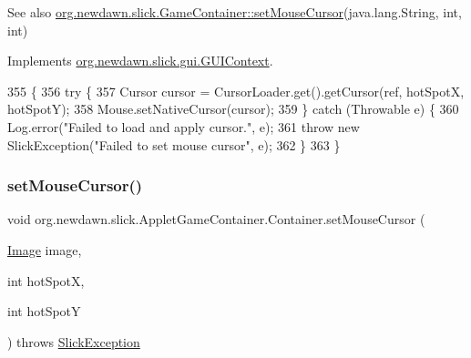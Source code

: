 \begin{DoxySeeAlso}{See also}
\mbox{\hyperlink{classorg_1_1newdawn_1_1slick_1_1_game_container_a13e789e67755f14bad1caf70e3bd6d4e}{org.\+newdawn.\+slick.\+Game\+Container\+::set\+Mouse\+Cursor}}(java.\+lang.\+String, int, int) 
\end{DoxySeeAlso}


Implements \mbox{\hyperlink{interfaceorg_1_1newdawn_1_1slick_1_1gui_1_1_g_u_i_context_a47c70498d554deaf50e328ec79385a20}{org.\+newdawn.\+slick.\+gui.\+G\+U\+I\+Context}}.


\begin{DoxyCode}
355                                                                                                \{
356          \textcolor{keywordflow}{try} \{
357             Cursor cursor = CursorLoader.get().getCursor(ref, hotSpotX, hotSpotY);
358             Mouse.setNativeCursor(cursor);
359          \} \textcolor{keywordflow}{catch} (Throwable e) \{
360             Log.error(\textcolor{stringliteral}{"Failed to load and apply cursor."}, e);
361             \textcolor{keywordflow}{throw} \textcolor{keyword}{new} SlickException(\textcolor{stringliteral}{"Failed to set mouse cursor"}, e);
362          \}
363       \}
\end{DoxyCode}
\mbox{\label{classorg_1_1newdawn_1_1slick_1_1_applet_game_container_1_1_container_a8080eb4d0538a0dfc9ae43dfae3f07d0}} 
\subsubsection{\texorpdfstring{set\+Mouse\+Cursor()}{setMouseCursor()}\hspace{0.1cm}{\footnotesize\ttfamily [2/4]}}
{\footnotesize\ttfamily void org.\+newdawn.\+slick.\+Applet\+Game\+Container.\+Container.\+set\+Mouse\+Cursor (\begin{DoxyParamCaption}\item[{\mbox{\hyperlink{classorg_1_1newdawn_1_1slick_1_1_image}{Image}}}]{image,  }\item[{int}]{hot\+SpotX,  }\item[{int}]{hot\+SpotY }\end{DoxyParamCaption}) throws \mbox{\hyperlink{classorg_1_1newdawn_1_1slick_1_1_slick_exception}{Slick\+Exception}}\hspace{0.3cm}{\ttfamily [inline]}}


